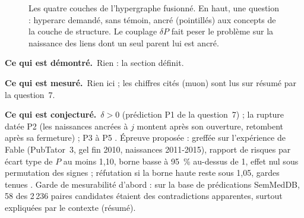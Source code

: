 \documentclass[11pt,a4paper]{article}
\theoremstyle{definition}
\theoremstyle{plain}
\newcommand{\demontre}{\par\noindent\textbf{Ce qui est démontré.}~}
\newcommand{\mesure}{\par\smallskip\noindent\textbf{Ce qui est mesuré.}~}
\newcommand{\conjecture}{\par\smallskip\noindent\textbf{Ce qui est conjecturé.}~}
\begin{document}
\begin{figure}[ht]
\centering
{}
\caption{Les quatre couches de l'hypergraphe fusionné. En haut, une question : hyperarc demandé,
sans témoin, ancré (pointillés) aux concepts de la couche de structure. Le couplage $\delta P$ fait
peser le problème sur la naissance des liens dont un seul parent lui est ancré.}
\label{fig:couches}
\end{figure}

\begin{statuts}
\demontre Rien : la section définit.
\mesure Rien ici ; les chiffres cités (muon) sont lus sur résumé par la question~7.
\conjecture $\delta>0$ (prédiction P1 de la question~7) ; la rupture datée P2 (les naissances
ancrées à $j$ montent après son ouverture, retombent après sa fermeture) ; P3 à P5 \cite[section~5]{q7}.
Épreuve proposée : greffée sur l'expérience de Fable (PubTator~3, gel fin 2010, naissances
2011-2015), rapport de risques par écart type de $P$ au moins 1,10, borne basse à 95~\% au-dessus
de 1, effet nul sous permutation des signes ; réfutation si la borne haute reste sous 1,05, gardes
tenues \cite[section~6]{q7}. Garde de mesurabilité d'abord : sur la base de prédications SemMedDB,
58 des 2\,236 paires candidates étaient des contradictions apparentes, surtout expliquées par le
contexte \cite{rosemblat2019} (résumé).
\end{statuts}
\end{document}

